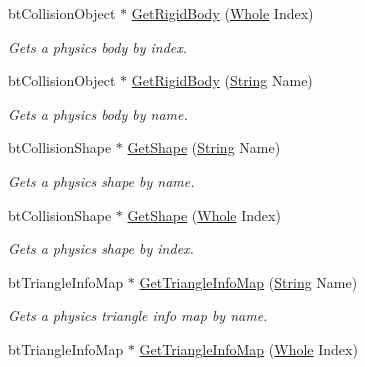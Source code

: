 \begin{DoxyCompactItemize}
btCollisionObject $\ast$ \hyperlink{classMezzanine_1_1internal_1_1BulletFile_a72b2b29170c96646926467452ba913c6}{GetRigidBody} (\hyperlink{namespaceMezzanine_adcbb6ce6d1eb4379d109e51171e2e493}{Whole} Index)
\begin{DoxyCompactList}\small\item\em Gets a physics body by index. \item\end{DoxyCompactList}\item 
btCollisionObject $\ast$ \hyperlink{classMezzanine_1_1internal_1_1BulletFile_a5c09e492abf00a82ccf82755968e7a5c}{GetRigidBody} (\hyperlink{namespaceMezzanine_acf9fcc130e6ebf08e3d8491aebcf1c86}{String} Name)
\begin{DoxyCompactList}\small\item\em Gets a physics body by name. \item\end{DoxyCompactList}\item 
btCollisionShape $\ast$ \hyperlink{classMezzanine_1_1internal_1_1BulletFile_a6f110baeb460957da0410153617440c1}{GetShape} (\hyperlink{namespaceMezzanine_acf9fcc130e6ebf08e3d8491aebcf1c86}{String} Name)
\begin{DoxyCompactList}\small\item\em Gets a physics shape by name. \item\end{DoxyCompactList}\item 
btCollisionShape $\ast$ \hyperlink{classMezzanine_1_1internal_1_1BulletFile_a27882635bb94ec384fc1a02619f31d74}{GetShape} (\hyperlink{namespaceMezzanine_adcbb6ce6d1eb4379d109e51171e2e493}{Whole} Index)
\begin{DoxyCompactList}\small\item\em Gets a physics shape by index. \item\end{DoxyCompactList}\item 
btTriangleInfoMap $\ast$ \hyperlink{classMezzanine_1_1internal_1_1BulletFile_a0b9b5a30adf8cc2066a288d9dd387523}{GetTriangleInfoMap} (\hyperlink{namespaceMezzanine_acf9fcc130e6ebf08e3d8491aebcf1c86}{String} Name)
\begin{DoxyCompactList}\small\item\em Gets a physics triangle info map by name. \item\end{DoxyCompactList}\item 
btTriangleInfoMap $\ast$ \hyperlink{classMezzanine_1_1internal_1_1BulletFile_ae59979e178ed8804e85a3e53502fbc6f}{GetTriangleInfoMap} (\hyperlink{namespaceMezzanine_adcbb6ce6d1eb4379d109e51171e2e493}{Whole} Index)

\end{DoxyCompactItemize}
